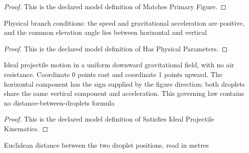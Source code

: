 \begin{proof}
  This is the declared model definition of Matches Primary Figure.
\end{proof}
\begin{definition}
  \label{def:physics:phyx-mini-0691:phyxminiproblems-problemphyxmini0691-hasphysicalparameters}
  Physical branch conditions: the speed and gravitational acceleration are positive, and the common elevation angle lies between horizontal and vertical
\end{definition}
\begin{proof}
  This is the declared model definition of Has Physical Parameters.
\end{proof}
\begin{definition}
  \label{def:physics:phyx-mini-0691:phyxminiproblems-problemphyxmini0691-satisfiesidealprojectilekinematics}
  Ideal projectile motion in a uniform downward gravitational field, with no air resistance. Coordinate 0 points east and coordinate 1 points upward. The horizontal component has the sign supplied by the figure direction; both droplets share the same vertical component and acceleration. This governing law contains no distance-between-droplets formula
\end{definition}
\begin{proof}
  This is the declared model definition of Satisfies Ideal Projectile Kinematics.
\end{proof}
\begin{definition}
  \label{def:physics:phyx-mini-0691:phyxminiproblems-problemphyxmini0691-separationinmetersat}
  Euclidean distance between the two droplet positions, read in metres
\end{definition}
